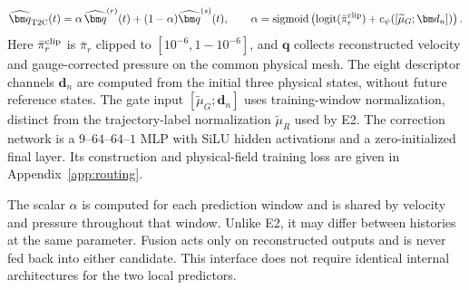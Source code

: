 \begin{equation}
  \widehat{\bm q}_{\rm T2C}(t)
  =\alpha\,\widehat{\bm q}^{(r)}(t)
   +(1-\alpha)\widehat{\bm q}^{(s)}(t),\qquad
  \alpha=\operatorname{sigmoid}
  \left(\operatorname{logit}(\bar\pi_r^{\rm clip})
       +c_\psi([\widetilde\mu_G;\bm d_n])\right).
  \label{eq:main_t2c}
\end{equation}
Here $\bar\pi_r^{\rm clip}$ is $\bar\pi_r$ clipped to
$[10^{-6},1-10^{-6}]$, and $\bm q$ collects reconstructed velocity and gauge-corrected pressure on the common physical mesh. The eight descriptor channels $\bm d_n$ are computed from the initial three physical states, without future reference states. The gate input $[\widetilde\mu_G;\bm d_n]$ uses training-window normalization, distinct from the trajectory-label normalization $\widetilde\mu_R$ used by E2. The correction network is a $9$--$64$--$64$--$1$ MLP with SiLU hidden activations and a zero-initialized final layer. Its construction and physical-field training loss are given in Appendix~\ref{app:routing}.

The scalar $\alpha$ is computed for each prediction window and is shared by velocity and pressure throughout that window.
Unlike E2, it may differ between histories at the same parameter. Fusion acts only on reconstructed outputs and is never fed back into either candidate. This interface does not require identical internal architectures for the two local predictors.

